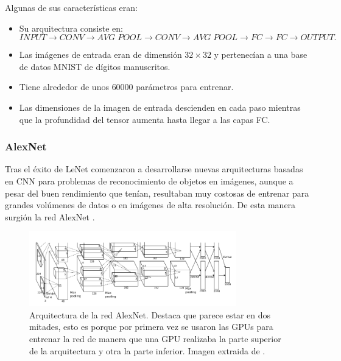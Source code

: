         \noindent Algunas de sus características eran: 

        \begin{itemize}
            \item Su arquitectura consiste en: 
            $$INPUT \rightarrow CONV \rightarrow AVG\;POOL \rightarrow CONV \rightarrow AVG \; POOL \rightarrow FC \rightarrow FC \rightarrow OUTPUT.$$
            \item Las imágenes de entrada eran de dimensión $32 \times 32$ y pertenecían a una base de datos MNIST de dígitos manuscritos.
            \item Tiene alrededor de unos $60000$ parámetros para entrenar.
            \item Las dimensiones de la imagen de entrada descienden en cada paso mientras que la profundidad del tensor aumenta hasta llegar a las capas FC.
        \end{itemize}

    \subsubsection{AlexNet}
        \noindent Tras el éxito de LeNet comenzaron a desarrollarse nuevas arquitecturas basadas en CNN para problemas de reconocimiento de objetos en imágenes, aunque a pesar del buen rendimiento que tenían, resultaban muy costosas de entrenar para grandes volúmenes de datos o en imágenes de alta resolución. De esta manera surgión la red AlexNet \cite{krizhevsky2012imagenet}.

        \begin{figure}[!h]
            \centering
            \includegraphics[width=0.8\textwidth]{img/AlexNet.png}
            \caption{Arquitectura de la red AlexNet. Destaca que parece estar  en dos mitades, esto es porque por primera vez se usaron las GPUs para entrenar la red de manera que una GPU realizaba la parte superior de la arquitectura y otra la parte inferior. Imagen extraida de \cite{krizhevsky2012imagenet}.}
            \label{fig:AlexNet}
        \end{figure}

